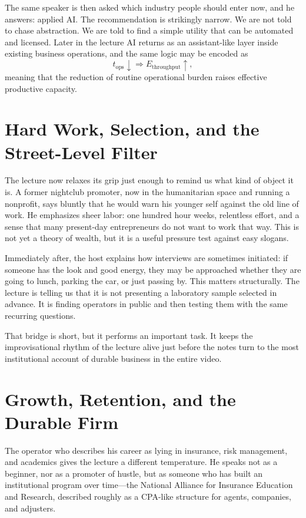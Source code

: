 The same speaker is then asked which industry people should enter now, and he answers: applied AI. The recommendation is strikingly narrow. We are not told to chase abstraction. We are told to find a simple utility that can be automated and licensed. Later in the lecture AI returns as an assistant-like layer inside existing business operations, and the same logic may be encoded as
\begin{equation}
t_{\text{ops}}\downarrow \Rightarrow E_{\text{throughput}}\uparrow,
\end{equation}
meaning that the reduction of routine operational burden raises effective productive capacity.

\section{Hard Work, Selection, and the Street-Level Filter}

The lecture now relaxes its grip just enough to remind us what kind of object it is. A former nightclub promoter, now in the humanitarian space and running a nonprofit, says bluntly that he would warn his younger self against the old line of work. He emphasizes sheer labor: one hundred hour weeks, relentless effort, and a sense that many present-day entrepreneurs do not want to work that way. This is not yet a theory of wealth, but it is a useful pressure test against easy slogans.

Immediately after, the host explains how interviews are sometimes initiated: if someone has the look and good energy, they may be approached whether they are going to lunch, parking the car, or just passing by. This matters structurally. The lecture is telling us that it is not presenting a laboratory sample selected in advance. It is finding operators in public and then testing them with the same recurring questions.

That bridge is short, but it performs an important task. It keeps the improvisational rhythm of the lecture alive just before the notes turn to the most institutional account of durable business in the entire video.

\section{Growth, Retention, and the Durable Firm}

The operator who describes his career as lying in insurance, risk management, and academics gives the lecture a different temperature. He speaks not as a beginner, nor as a promoter of hustle, but as someone who has built an institutional program over time---the National Alliance for Insurance Education and Research, described roughly as a CPA-like structure for agents, companies, and adjusters.

